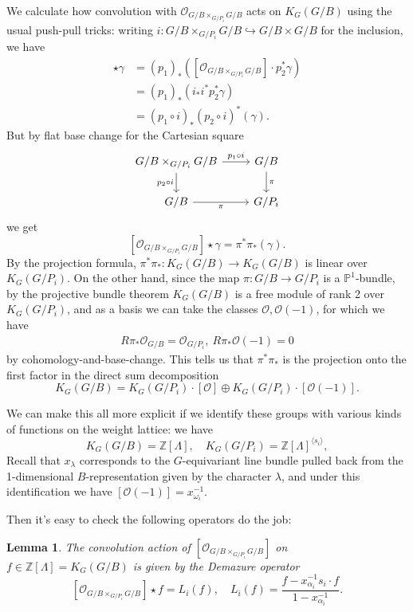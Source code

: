\documentclass[11pt]{amsart}
\newtheorem{lemma}[dummy]{Lemma}
\theoremstyle{definition}
\newcommand{\bP}{\mathbb{P}}
\newcommand{\bZ}{\mathbb{Z}}
\newcommand{\Oc}{\mathcal{O}}
\numberwithin{equation}{subsection}
\numberwithin{figure}{subsection}
\newcommand{\pt}{\mathrm{pt}}
\begin{document}
We calculate how convolution with $\mathcal{O}_{G/B\times_{G/P_i} G/B}$ acts on $K_G(G/B)$ using the usual push-pull tricks: writing $i:G/B\times_{G/P_i} G/B\hookrightarrow G/B\times G/B$ for the inclusion, we have
\begin{align*}
[\Oc_{G/B\times_{G/P_i} G/B}]\star \gamma &=(p_1)_*\left([\Oc_{G/B\times_{G/P_i} G/B}]\cdot p_2^*\gamma\right)\\
&=(p_1)_*\left(i_*i^*p_2^*\gamma\right)\\
&=(p_1\circ i)_*(p_2\circ i)^*(\gamma).
\end{align*}
But by flat base change for the Cartesian square
$$
\begin{tikzcd}
G/B\times_{G/P_i}G/B \arrow{r}{p_1\circ i} \arrow[swap]{d}{p_2\circ i}& G/B \arrow{d}{\pi} \\
G/B \arrow[swap]{r}{\pi} & G/P_i
\end{tikzcd}
$$
we get
$$
[\Oc_{G/B\times_{G/P_i} G/B}]\star \gamma = \pi^*\pi_*(\gamma).
$$
By the projection formula, $\pi^*\pi_*:K_G(G/B)\rightarrow K_G(G/B)$ is linear over $K_G(G/P_i)$.
On the other hand, since the map $\pi:G/B\rightarrow G/P_i$ is a $\bP^1$-bundle,
by the projective bundle theorem $K_G(G/B)$ is a free module of rank 2 over $K_G(G/P_i)$, and as a basis we can take the classes $\Oc,\Oc(-1)$, for which we have 
\begin{align}
\label{eq:pi-pushforwards}
R\pi_*\Oc_{G/B}=\Oc_{G/P_i},~R\pi_*\Oc(-1)=0
\end{align}
by cohomology-and-base-change.
This tells us that $\pi^*\pi_*$ is the projection onto the first factor in the direct sum decomposition
$$
K_G(G/B)= K_G(G/P_i)\cdot [\Oc]\oplus K_G(G/P_i)\cdot [\Oc(-1)].
$$




We can make this all more explicit if we identify these groups with various kinds of functions on the weight lattice: we have
$$
K_G(G/B)=\bZ[\Lambda], \quad K_{G}(G/P_i)=\bZ[\Lambda]^{\langle s_i\rangle},
$$
Recall that $x_\lambda$ corresponds to the $G$-equivariant line bundle pulled back from the 1-dimensional $B$-representation given by the character $\lambda$, and under this identification we have $[\Oc(-1)]=x_{\omega_i}^{-1}$. 

Then it's easy to check the following operators do the job:
\begin{lemma}
The convolution action of $[\Oc_{G/B\times_{G/P_i} G/B}]$ on $f\in \bZ[\Lambda]=K_G(G/B)$ is given by the \emph{Demazure operator}
$$
[\Oc_{G/B\times_{G/P_i} G/B}]\star f=L_i(f),\quad L_i(f) = \frac{f - x_{\alpha_i}^{-1}s_i\cdot f}{1-x_{\alpha_i}^{-1}}.
$$
\end{lemma}
\end{document}
